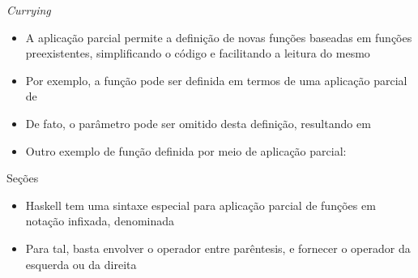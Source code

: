 \begin{frame}[fragile]{\it Currying}

    \begin{itemize}
        \item A aplicação parcial permite a definição de novas funções baseadas em funções
            preexistentes, simplificando o código e facilitando a leitura do mesmo

        \item Por exemplo, a função  pode ser definida em termos de uma
            aplicação parcial de 


        \item De fato, o parâmetro  pode ser omitido desta definição,
            resultando em


        \item Outro exemplo de função definida por meio de aplicação parcial:

    \end{itemize}

\end{frame}

\begin{frame}[fragile]{Seções}

    \begin{itemize}
        \item Haskell tem uma sintaxe especial para aplicação parcial de funções em notação
            infixada, denominada 

        \item Para tal, basta envolver o operador entre parêntesis, e fornecer o operador da
            esquerda ou da direita 

    \end{itemize}

\end{frame}


